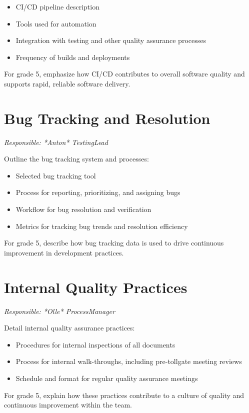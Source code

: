 \documentclass{article}
\begin{document}
\begin{itemize}
    \item CI/CD pipeline description
    \item Tools used for automation
    \item Integration with testing and other quality assurance processes
    \item Frequency of builds and deployments
\end{itemize}

For grade 5, emphasize how CI/CD contributes to overall software quality and supports rapid, reliable software delivery.

\section{Bug Tracking and Resolution}
\textit{Responsible: *Anton* TestingLead}

Outline the bug tracking system and processes:

\begin{itemize}
    \item Selected bug tracking tool
    \item Process for reporting, prioritizing, and assigning bugs
    \item Workflow for bug resolution and verification
    \item Metrics for tracking bug trends and resolution efficiency
\end{itemize}

For grade 5, describe how bug tracking data is used to drive continuous improvement in development practices.

\section{Internal Quality Practices}
\textit{Responsible: *Olle* ProcessManager}

Detail internal quality assurance practices:

\begin{itemize}
    \item Procedures for internal inspections of all documents
    \item Process for internal walk-throughs, including pre-tollgate meeting reviews
    \item Schedule and format for regular quality assurance meetings
\end{itemize}

For grade 5, explain how these practices contribute to a culture of quality and continuous improvement within the team.
\end{document}
